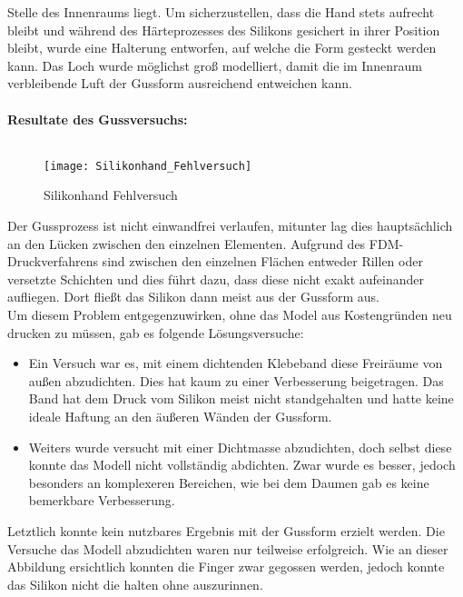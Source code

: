 \documentclass[titlepage,12pt,twoside]{article}
\begin{document}
Stelle des Innenraums liegt. Um sicherzustellen, dass die Hand stets aufrecht bleibt und während des Härteprozesses des Silikons gesichert in ihrer Position bleibt, wurde eine Halterung entworfen, auf welche die Form gesteckt werden kann. Das Loch 
wurde möglichst groß modelliert, damit die im Innenraum verbleibende Luft der Gussform ausreichend entweichen kann. \\
\\
\newpage
\textbf{Resultate des Gussversuchs:} \\
\\
\begin{figure}[H]
	\begin{center}
		\scalebox{0.8}
		{\texttt{[image: Silikonhand\_Fehlversuch]}}
		\caption{Silikonhand Fehlversuch}
		\label{fig:Silikonhand_Fehlversuch}			
	\end{center}
\end{figure}
\hfill \break
Der Gussprozess ist nicht einwandfrei verlaufen, mitunter lag dies hauptsächlich an den Lücken zwischen den einzelnen Elementen. Aufgrund des FDM-Druckverfahrens sind zwischen den einzelnen Flächen entweder Rillen oder versetzte Schichten und dies 
führt dazu, dass diese nicht exakt aufeinander aufliegen. Dort fließt das Silikon dann meist aus der Gussform aus. \\
Um diesem Problem entgegenzuwirken, ohne das Model aus Kostengründen neu drucken zu müssen, gab es folgende Lösungsversuche:
\begin{itemize}
	\item Ein Versuch war es, mit einem dichtenden Klebeband diese Freiräume von außen abzudichten. Dies hat kaum zu einer Verbesserung beigetragen. Das Band hat dem Druck vom Silikon meist nicht standgehalten und hatte keine ideale Haftung an 
	den äußeren Wänden der Gussform.
	\item Weiters wurde versucht mit einer Dichtmasse abzudichten, doch selbst diese konnte das Modell nicht vollständig abdichten. Zwar wurde es besser, jedoch besonders an komplexeren Bereichen, wie bei dem Daumen gab es keine bemerkbare Verbesserung.
\end{itemize}
\hfill \break
Letztlich konnte kein nutzbares Ergebnis mit der Gussform erzielt werden. Die Versuche das Modell abzudichten waren nur teilweise erfolgreich. Wie an dieser Abbildung ersichtlich konnten die Finger zwar gegossen werden, jedoch konnte das Silikon 
nicht die  halten ohne auszurinnen. \\
\\
\end{document}
